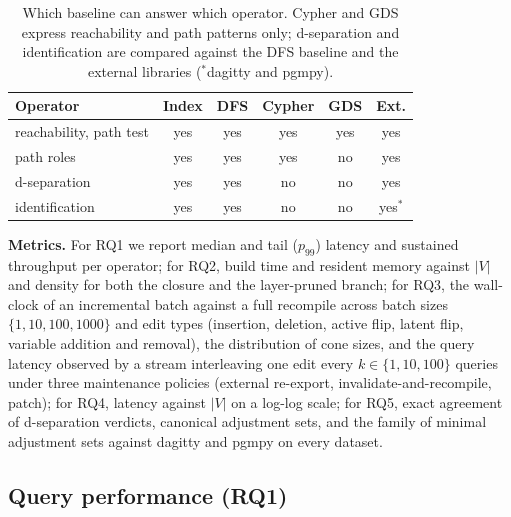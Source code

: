 \begin{table}[t]\centering
\caption{Which baseline can answer which operator. Cypher and GDS express
reachability and path patterns only; d-separation and identification are
compared against the DFS baseline and the external libraries ($^\ast$dagitty
and pgmpy).}
\label{tab:coverage}
\footnotesize
\setlength{\tabcolsep}{3pt}
\begin{tabular}{@{}lccccc@{}}
\toprule
Operator & Index & DFS & Cypher & GDS & Ext. \\
\midrule
reachability, path test & yes & yes & yes & yes & yes \\
path roles              & yes & yes & yes & no  & yes \\
d-separation            & yes & yes & no  & no  & yes \\
identification          & yes & yes & no  & no  & yes$^\ast$ \\
\bottomrule
\end{tabular}
\end{table}

\noindent\textbf{Metrics.} For RQ1 we report median and tail ($p_{99}$)
latency and sustained throughput per operator; for RQ2, build time and
resident memory against $|V|$ and density for both the closure and the
layer-pruned branch; for RQ3, the wall-clock of an incremental batch against
a full recompile across batch sizes $\{1, 10, 100, 1000\}$ and edit types
(insertion, deletion, \textsf{active} flip, \textsf{latent} flip, variable
addition and removal), the distribution of cone sizes, and the query latency
observed by a stream interleaving one edit every $k \in \{1, 10, 100\}$
queries under three maintenance policies (external re-export,
invalidate-and-recompile, patch); for RQ4, latency against $|V|$ on a log-log
scale; for RQ5, exact agreement of d-separation verdicts, canonical
adjustment sets, and the family of minimal adjustment sets against dagitty
and pgmpy on every dataset.

\subsection{Query performance (RQ1)}



